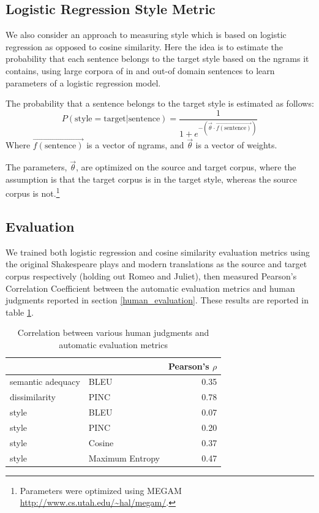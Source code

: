 \documentclass[10pt,a5paper,twoside]{article}
\begin{document}
\subsection{Logistic Regression Style Metric}
We also consider an approach to measuring style which is based on logistic regression as opposed to cosine similarity.
Here the idea is to estimate the probability that each
sentence belongs to the target style based on the ngrams it contains, using large corpora of in and out-of domain sentences to learn  parameters of a logistic regression model.

The probability that a sentence belongs to the target style is estimated as follows:
\[
P(\text{style} = \text{target}|\text{sentence}) = \frac{1}{1 + e^{-\left( \vec{\theta} \cdot \vec{f(\text{sentence})} \right)}}
\]
Where $\vec{f(\text{sentence})}$ is a vector of ngrams, and $\vec{\theta}$ is a vector of weights.  

The parameters, $\vec{\theta}$, are optimized on the source and target corpus, where the assumption is that the target corpus
is in the target style, whereas the source corpus is not.\footnote{
  Parameters were optimized using MEGAM \url{http://www.cs.utah.edu/~hal/megam/}.
}

\subsection{Evaluation}
We trained both logistic regression and cosine similarity evaluation metrics using the original Shakespeare plays and modern translations as
the source and target corpus respectively (holding out Romeo and Juliet), then measured Pearson's Correlation Coefficient between the automatic
evaluation metrics and human judgments reported in section \ref{human_evaluation}.  These results are reported in table \ref{correlation}.

\begin{table}
  \begin{center}
  \begin{tabular}{|l|l|r|}
    \hline
    & & Pearson's $\rho$ \\
    \hline
    \hline
    semantic adequacy & BLEU & 0.35 \\
    \hline
    dissimilarity & PINC & 0.78 \\
    \hline
    style & BLEU & 0.07 \\
    \hline
    style & PINC & 0.20 \\
    \hline
    style & Cosine & 0.37 \\
    \hline
    style & Maximum Entropy & 0.47 \\
    \hline
  \end{tabular}
  \end{center}
  \caption{Correlation between various human judgments and automatic evaluation metrics}
  \label{correlation}
\end{table}
\end{document}
